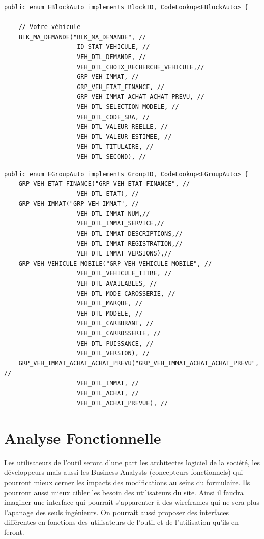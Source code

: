 \begin{lstlisting}[caption=Enum Java du bloc Ma Demande]
public enum EBlockAuto implements BlockID, CodeLookup<EBlockAuto> {

    // Votre véhicule
    BLK_MA_DEMANDE("BLK_MA_DEMANDE", //
                    ID_STAT_VEHICULE, //
                    VEH_DTL_DEMANDE, //
                    VEH_DTL_CHOIX_RECHERCHE_VEHICULE,//
                    GRP_VEH_IMMAT, //
                    GRP_VEH_ETAT_FINANCE, //
                    GRP_VEH_IMMAT_ACHAT_ACHAT_PREVU, //
                    VEH_DTL_SELECTION_MODELE, //
                    VEH_DTL_CODE_SRA, //
                    VEH_DTL_VALEUR_REELLE, //
                    VEH_DTL_VALEUR_ESTIMEE, //
                    VEH_DTL_TITULAIRE, //
                    VEH_DTL_SECOND), //
\end{lstlisting}

\begin{lstlisting}[caption=Enum Java du groupe choix du modèle]
public enum EGroupAuto implements GroupID, CodeLookup<EGroupAuto> {
    GRP_VEH_ETAT_FINANCE("GRP_VEH_ETAT_FINANCE", //
                    VEH_DTL_ETAT), //
    GRP_VEH_IMMAT("GRP_VEH_IMMAT", //
                    VEH_DTL_IMMAT_NUM,//
                    VEH_DTL_IMMAT_SERVICE,//
                    VEH_DTL_IMMAT_DESCRIPTIONS,//
                    VEH_DTL_IMMAT_REGISTRATION,//
                    VEH_DTL_IMMAT_VERSIONS),//
    GRP_VEH_VEHICULE_MOBILE("GRP_VEH_VEHICULE_MOBILE", //
                    VEH_DTL_VEHICULE_TITRE, //
                    VEH_DTL_AVAILABLES, //
                    VEH_DTL_MODE_CAROSSERIE, //
                    VEH_DTL_MARQUE, //
                    VEH_DTL_MODELE, //
                    VEH_DTL_CARBURANT, //
                    VEH_DTL_CARROSSERIE, //
                    VEH_DTL_PUISSANCE, //
                    VEH_DTL_VERSION), //
    GRP_VEH_IMMAT_ACHAT_ACHAT_PREVU("GRP_VEH_IMMAT_ACHAT_ACHAT_PREVU", //
                    VEH_DTL_IMMAT, //
                    VEH_DTL_ACHAT, //
                    VEH_DTL_ACHAT_PREVUE), //
\end{lstlisting}
\clearpage
\section{Analyse Fonctionnelle}
Les utilisateurs de l’outil seront d’une part les architectes logiciel de la société, les développeurs mais aussi les Business Analysts (concepteurs fonctionnels) qui pourront mieux cerner les impacts des modifications au seins du formulaire. Ils pourront aussi mieux cibler les besoin des utilisateurs du site. Ainsi il faudra imaginer une interface qui pourrait s'apparenter à des wireframes qui ne sera plus l’apanage des seuls ingénieurs. On pourrait aussi proposer des interfaces différentes en fonctions des utilisateurs de l'outil et de l'utilisation qu'ils en feront.

